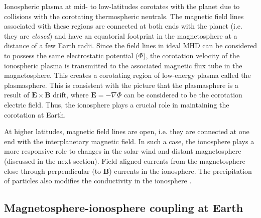 Ionospheric plasma at mid- to low-latitudes corotates with the planet due to collisions with the corotating thermospheric neutrals. The magnetic field lines associated with these regions are connected at both ends with the planet (i.e. they are \emph{closed}) and have an equatorial footprint in the magnetosphere at a distance of a few Earth radii. Since the field lines in ideal MHD can be considered to possess the same electrostatic potential ($\Phi$), the corotation velocity of the ionospheric plasma is transmitted to the associated magnetic flux tube in the magnetosphere. This creates a corotating region of low-energy plasma called the plasmasphere. This is consistent with the picture that the plasmasphere is a result of $\mathbf{E}\times\mathbf{B}$ drift, where $\mathbf{E}=-\nabla \Phi$ can be considered to be the corotation electric field. Thus, the ionosphere plays a crucial role in maintaining the corotation at Earth. 

At higher latitudes, magnetic field lines are open, i.e. they are connected at one end with the interplanetary magnetic field. In such a case, the ionosphere plays a more responsive role to changes in the solar wind and distant magnetosphere (discussed in the next section). Field aligned currents from the magnetosphere close through perpendicular (to $\mathbf{B}$) currents in the ionosphere. The precipitation of particles also modifies the conductivity in the ionosphere \cite{Schunk2009Ionospheres}. 

\subsection{Magnetosphere-ionosphere coupling at Earth}

